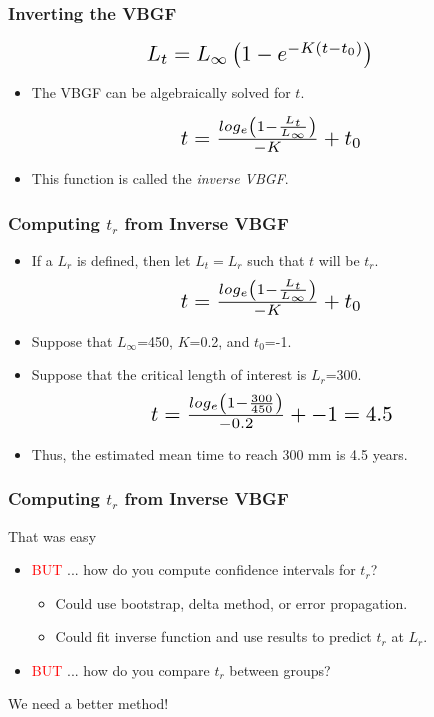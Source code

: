 \documentclass[xcolor=dvipsnames]{beamer}\usepackage[]{graphicx}\usepackage[]{color}
\newcommand*{\Scale}[2][4]{\scalebox{#1}{\ensuremath{#2}}}%
\begin{document}
\begin{frame}[fragile, t]
\frametitle{Inverting the VBGF}

\[\Scale[1.5]{ L_{t} = L_{\infty}\left(1-e^{-K(t-t_{0})}\right) }\]

\bigskip
\begin{itemize}
  \item The VBGF can be algebraically solved for $t$.
  \pause
  \bigskip

\[\Scale[1.5]{ t = \frac{log_{e}\left(1-\frac{L_{t}}{L_{\infty}}\right)}{-K} + t_{0} }\]

  \pause
  \bigskip
  \item This function is called the \textit{inverse VBGF}.
\end{itemize}
\end{frame}


\begin{frame}[fragile, t]
\frametitle{Computing $t_{r}$ from Inverse VBGF}
\begin{itemize}
  \item If a $L_{r}$ is defined, then let $L_{t}=L_{r}$ such that $t$ will be $t_{r}$.
  \smallskip
\[\Scale[1.5]{ t = \frac{log_{e}\left(1-\frac{L_{t}}{L_{\infty}}\right)}{-K} + t_{0} }\]
  \pause
  \smallskip
  \item Suppose that $L_{\infty}$=450, $K$=0.2, and $t_{0}$=-1.
  \item Suppose that the critical length of interest is $L_{r}$=300.
  \pause
  \smallskip
\[\Scale[1.5]{ t = \frac{log_{e}\left(1-\frac{300}{450}\right)}{-0.2} + -1 = 4.5}\]
  \pause
  \smallskip
  \item Thus, the estimated mean time to reach 300 mm is 4.5 years.
\end{itemize}
\end{frame}


\begin{frame}[fragile, t]
\frametitle{Computing $t_{r}$ from Inverse VBGF}
\begin{center}
{\LARGE That was easy}
\end{center}
\pause
\vspace{0.25in}
\begin{itemize}
  \item \textcolor{red}{BUT} ... how do you compute confidence intervals for $t_{r}$?
  \pause
  \begin{itemize}
    \item Could use bootstrap, delta method, or error propagation.
    \item Could fit inverse function and use results to predict $t_{r}$ at  $L_{r}$.
  \end{itemize}
  \pause
  \bigskip
  \item \textcolor{red}{BUT} ... how do you compare $t_{r}$ between groups?
\end{itemize}
\pause
\vspace{0.5in}
\begin{center}
{\LARGE We need a better method!}
\end{center}
\end{frame}
\end{document}
